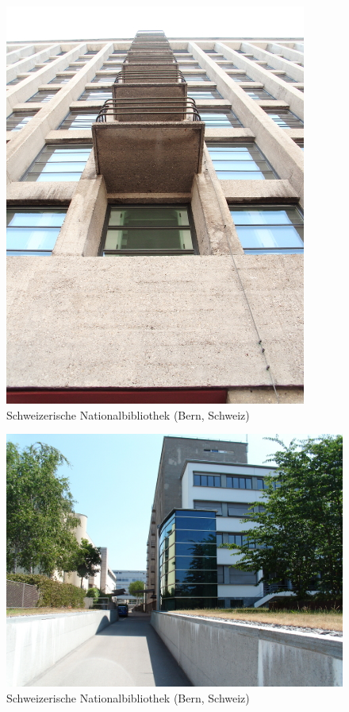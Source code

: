 \documentclass[a4paper,
fontsize=11pt,
oneside,
numbers=noperiodatend,
parskip=half-,
bibliography=totoc,
final
]{scrartcl}
\begin{document}
\begin{figure}[htbp]
\centering
\includegraphics{./img/007.jpg}
\caption{Schweizerische Nationalbibliothek (Bern,
Schweiz)}
\end{figure}

\begin{figure}[htbp]
\centering
\includegraphics{./img/008.jpg}
\caption{Schweizerische Nationalbibliothek (Bern,
Schweiz)}
\end{figure}
\end{document}
